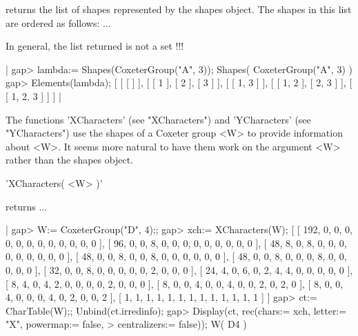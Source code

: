 returns the list of shapes represented by the shapes object.  The shapes
in this list are ordered as follows: ...

In general, the list returned is not a set !!!

|    gap> lambda:= Shapes(CoxeterGroup("A", 3));
    Shapes( CoxeterGroup("A", 3) )
    gap> Elements(lambda);
    [ [ [  ] ], [ [ 1 ], [ 2 ], [ 3 ] ], [ [ 1, 3 ] ], 
      [ [ 1, 2 ], [ 2, 3 ] ], [ [ 1, 2, 3 ] ] ] |


The  functions 'XCharacters' (see  "XCharacters") and  'YCharacters' (see
"YCharacters")  use  the  shapes  of  a  Coxeter  group  <W>  to  provide
information about  <W>.  It seems more  natural to have them  work on the
argument <W> rather than the shapes object.


'XCharacters( <W> )'

returns  ...

    
    

|    gap> W:= CoxeterGroup("D", 4);;
    gap> xch:= XCharacters(W);                     
    [ [ 192, 0, 0, 0, 0, 0, 0, 0, 0, 0, 0, 0, 0 ], 
      [ 96, 0, 0, 8, 0, 0, 0, 0, 0, 0, 0, 0, 0 ], 
      [ 48, 8, 0, 8, 0, 0, 0, 0, 0, 0, 0, 0, 0 ], 
      [ 48, 0, 0, 8, 0, 0, 8, 0, 0, 0, 0, 0, 0 ], 
      [ 48, 0, 0, 8, 0, 0, 0, 8, 0, 0, 0, 0, 0 ], 
      [ 32, 0, 0, 8, 0, 0, 0, 0, 0, 2, 0, 0, 0 ], 
      [ 24, 4, 0, 6, 0, 2, 4, 4, 0, 0, 0, 0, 0 ], 
      [ 8, 4, 0, 4, 2, 0, 0, 0, 0, 2, 0, 0, 0 ], 
      [ 8, 0, 0, 4, 0, 0, 4, 0, 0, 2, 0, 2, 0 ], 
      [ 8, 0, 0, 4, 0, 0, 0, 4, 0, 2, 0, 0, 2 ], 
      [ 1, 1, 1, 1, 1, 1, 1, 1, 1, 1, 1, 1, 1 ] ]
    gap> ct:= CharTable(W);;  Unbind(ct.irredinfo);
    gap> Display(ct, rec(chars:= xch, letter:= "X", powermap:= false,        
    >                    centralizers:= false));
    W( D4 )
    
